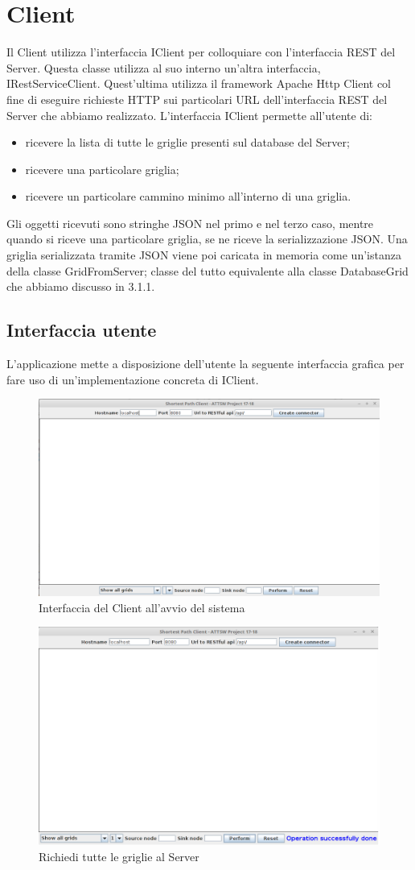 \section{Client}
Il Client utilizza l'interfaccia IClient per colloquiare con l'interfaccia REST del Server. Questa classe utilizza al suo interno un'altra interfaccia, IRestServiceClient. Quest'ultima utilizza il framework Apache Http Client col fine di eseguire richieste HTTP sui particolari URL dell'interfaccia REST del Server che abbiamo realizzato. L'interfaccia IClient permette all'utente di:
\begin{itemize}
	\item ricevere la lista di tutte le griglie presenti sul database del Server;
	\item ricevere una particolare griglia;
	\item ricevere un particolare cammino minimo all'interno di una griglia.
\end{itemize}
Gli oggetti ricevuti sono stringhe JSON nel primo e nel terzo caso, mentre quando si riceve una particolare griglia, se ne riceve la serializzazione JSON. Una griglia serializzata tramite JSON viene poi caricata in memoria come un'istanza della classe GridFromServer; classe del tutto equivalente alla classe DatabaseGrid che abbiamo discusso in 3.1.1.
\subsection{Interfaccia utente}
L'applicazione mette a disposizione dell'utente la seguente interfaccia grafica per fare uso di un'implementazione concreta di IClient.
\begin{figure}[ht]
	\centering
	\includegraphics[width=0.7\linewidth]{Chapters/1}
	\caption[Interfaccia utente]{Interfaccia del Client all'avvio del sistema}
	\label{fig:1}
\end{figure}

\begin{figure}[ht]
	\centering
	\includegraphics[width=0.7\linewidth]{Chapters/2}
	\caption[Interfaccia utente]{Richiedi tutte le griglie al Server}
	\label{fig:2}
\end{figure}

